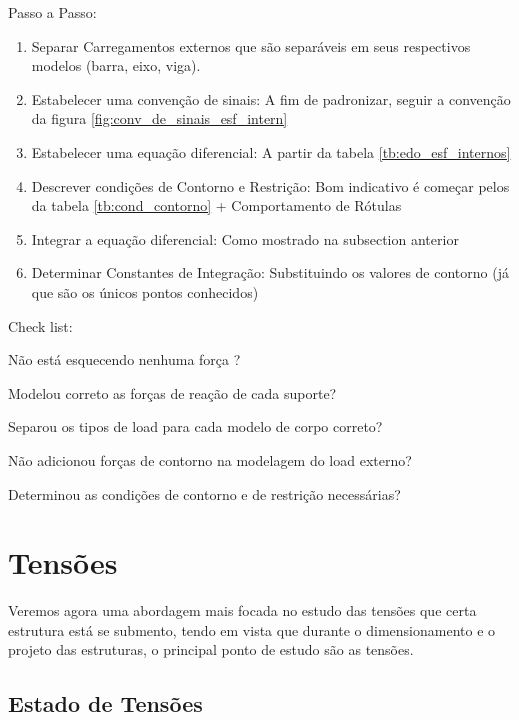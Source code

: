 \documentclass{article}
\begin{document}
\begin{minipage}[t]{.7\textwidth}
    Passo a Passo:
    \begin{enumerate}\addtocounter{enumi}{-1}\tiny
        \item Separar Carregamentos externos que são separáveis em seus respectivos modelos (barra, eixo, viga).
        \item Estabelecer uma convenção de sinais: A fim de padronizar, seguir a convenção da figura \ref{fig:conv_de_sinais_esf_intern}
        \item Estabelecer uma equação diferencial: A partir da tabela \ref{tb:edo_esf_internos}
        \item Descrever condições de Contorno e Restrição: Bom indicativo é começar pelos da tabela \ref{tb:cond_contorno} + Comportamento de Rótulas
        \item Integrar a equação diferencial: Como mostrado na subsection anterior
        \item Determinar Constantes de Integração: Substituindo os valores de contorno (já que são os únicos pontos conhecidos)
    \end{enumerate}
\end{minipage}\hfill
\begin{minipage}[t]{.3\textwidth}
    Check list:
    \begin{todolist}\tiny
        \item Não está esquecendo nenhuma força ?
        \item Modelou correto as forças de reação de cada suporte?
        \item Separou os tipos de load para cada modelo de corpo correto?
        \item Não adicionou forças de contorno na modelagem do load externo?
        \item Determinou as condições de contorno e de restrição necessárias?
    \end{todolist}
\end{minipage}


\section{Tensões}
Veremos agora uma abordagem mais focada no estudo das tensões que certa estrutura está se submento, tendo em vista que durante o dimensionamento e o projeto das estruturas, o principal ponto de estudo são as tensões.

\subsection{Estado de Tensões}
\end{document}

